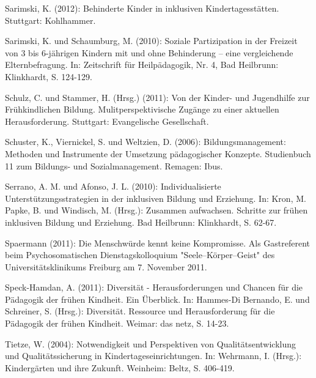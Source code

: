 Sarimski, K. (2012): Behinderte Kinder in inklusiven Kindertagesstätten. Stuttgart: Kohlhammer. 

Sarimski, K. und Schaumburg, M. (2010): Soziale Partizipation in der Freizeit von 3 bis 6-jährigen Kindern mit und ohne Behinderung -- eine vergleichende Elternbefragung. In: Zeitschrift für Heilpädagogik, Nr. 4, Bad Heilbrunn: Klinkhardt, S. 124-129.



Schulz, C. und Stammer, H. (Hrsg.) (2011): Von der Kinder- und Jugendhilfe zur Frühkindlichen Bildung. Mulitperspektivische Zugänge zu einer aktuellen Herausforderung. Stuttgart: Evangelische Gesellschaft.

Schuster, K., Viernickel, S. und Weltzien, D. (2006): Bildungsmanagement: Methoden und Instrumente der Umsetzung pädagogischer Konzepte. Studienbuch 11 zum Bildungs- und Sozialmanagement. Remagen: Ibus.

Serrano, A. M. und Afonso, J. L. (2010): Individualisierte Unterstützungsstrategien in der inklusiven Bildung und Erziehung. In: Kron, M. Papke, B. und Windisch, M. (Hrsg.): Zusammen aufwachsen. Schritte zur frühen inklusiven Bildung und Erziehung. Bad Heilbrunn: Klinkhardt, S. 62-67.

Spaermann (2011): Die Menschwürde kennt keine Kompromisse. Als Gastreferent beim Psychosomatischen Dienstagskolloquium "Seele–Körper–Geist" des Universitätsklinikums Freiburg am 7. November 2011.

Speck-Hamdan, A. (2011): Diversität - Herausforderungen und Chancen für die Pädagogik der frühen Kindheit. Ein Überblick. In: Hammes-Di Bernando, E. und Schreiner, S. (Hrsg.): Diversität. Ressource und Herausforderung für die Pädagogik der frühen Kindheit. Weimar: das netz, S. 14-23.

Tietze, W. (2004): Notwendigkeit und Perspektiven von Qualitätsentwicklung und Qualitätssicherung in Kindertageseinrichtungen. In: Wehrmann, I. (Hrsg.): Kindergärten und ihre Zukunft. Weinheim: Beltz, S. 406-419.

